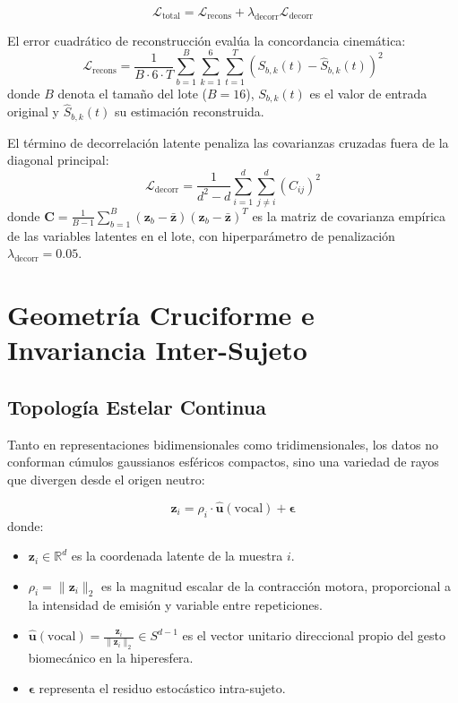 \documentclass[11pt,a4paper]{article}
\begin{document}
\begin{equation}
    \mathcal{L}_{\text{total}} = \mathcal{L}_{\text{recons}} + \lambda_{\text{decorr}} \mathcal{L}_{\text{decorr}}
    \label{eq:loss_total}
\end{equation}

El error cuadrático de reconstrucción evalúa la concordancia cinemática:
\begin{equation}
    \mathcal{L}_{\text{recons}} = \frac{1}{B \cdot 6 \cdot T} \sum_{b=1}^{B} \sum_{k=1}^{6} \sum_{t=1}^{T} \left( S_{b,k}(t) - \hat{S}_{b,k}(t) \right)^2
    \label{eq:loss_recons}
\end{equation}
donde $B$ denota el tamaño del lote ($B=16$), $S_{b,k}(t)$ es el valor de entrada original y $\hat{S}_{b,k}(t)$ su estimación reconstruida.

El término de decorrelación latente penaliza las covarianzas cruzadas fuera de la diagonal principal:
\begin{equation}
    \mathcal{L}_{\text{decorr}} = \frac{1}{d^2 - d} \sum_{i=1}^{d} \sum_{j \neq i}^{d} \left( C_{ij} \right)^2
    \label{eq:loss_decorr}
\end{equation}
donde $\mathbf{C} = \frac{1}{B-1} \sum_{b=1}^{B} (\mathbf{z}_b - \bar{\mathbf{z}})(\mathbf{z}_b - \bar{\mathbf{z}})^T$ es la matriz de covarianza empírica de las variables latentes en el lote, con hiperparámetro de penalización $\lambda_{\text{decorr}} = 0.05$.

\section{Geometría Cruciforme e Invariancia Inter-Sujeto}
\label{sec:geometria_invarianza}

\subsection{Topología Estelar Continua}
\label{subsec:topologia_estelar}

Tanto en representaciones bidimensionales como tridimensionales, los datos no conforman cúmulos gaussianos esféricos compactos, sino una variedad de rayos que divergen desde el origen neutro:

\begin{equation}
    \mathbf{z}_i = \rho_i \cdot \hat{\mathbf{u}}(\text{vocal}) + \boldsymbol{\epsilon}
    \label{eq:modelo_radial}
\end{equation}
donde:
\begin{itemize}
    \item $\mathbf{z}_i \in \mathbb{R}^d$ es la coordenada latente de la muestra $i$.
    \item $\rho_i = \|\mathbf{z}_i\|_2$ es la magnitud escalar de la contracción motora, proporcional a la intensidad de emisión y variable entre repeticiones.
    \item $\hat{\mathbf{u}}(\text{vocal}) = \frac{\mathbf{z}_i}{\|\mathbf{z}_i\|_2} \in S^{d-1}$ es el vector unitario direccional propio del gesto biomecánico en la hiperesfera.
    \item $\boldsymbol{\epsilon}$ representa el residuo estocástico intra-sujeto.
\end{itemize}
\end{document}
